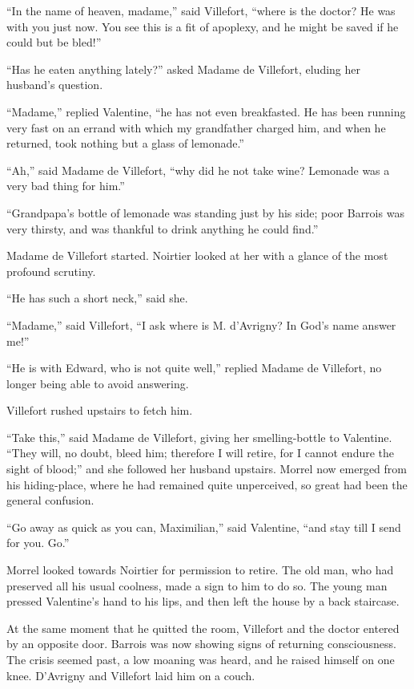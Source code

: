 “In the name of heaven, madame,” said Villefort, “where is the doctor?
He was with you just now. You see this is a fit of apoplexy, and he
might be saved if he could but be bled!”

“Has he eaten anything lately?” asked Madame de Villefort, eluding her
husband’s question.

“Madame,” replied Valentine, “he has not even breakfasted. He has been
running very fast on an errand with which my grandfather charged him,
and when he returned, took nothing but a glass of lemonade.”

“Ah,” said Madame de Villefort, “why did he not take wine? Lemonade was
a very bad thing for him.”

“Grandpapa’s bottle of lemonade was standing just by his side; poor
Barrois was very thirsty, and was thankful to drink anything he could
find.”

Madame de Villefort started. Noirtier looked at her with a glance of
the most profound scrutiny.

“He has such a short neck,” said she.

“Madame,” said Villefort, “I ask where is M. d’Avrigny? In God’s name
answer me!”

“He is with Edward, who is not quite well,” replied Madame de
Villefort, no longer being able to avoid answering.

Villefort rushed upstairs to fetch him.

“Take this,” said Madame de Villefort, giving her smelling-bottle to
Valentine. “They will, no doubt, bleed him; therefore I will retire,
for I cannot endure the sight of blood;” and she followed her husband
upstairs. Morrel now emerged from his hiding-place, where he had
remained quite unperceived, so great had been the general confusion.

“Go away as quick as you can, Maximilian,” said Valentine, “and stay
till I send for you. Go.”

Morrel looked towards Noirtier for permission to retire. The old man,
who had preserved all his usual coolness, made a sign to him to do so.
The young man pressed Valentine’s hand to his lips, and then left the
house by a back staircase.

At the same moment that he quitted the room, Villefort and the doctor
entered by an opposite door. Barrois was now showing signs of returning
consciousness. The crisis seemed past, a low moaning was heard, and he
raised himself on one knee. D’Avrigny and Villefort laid him on a
couch.

